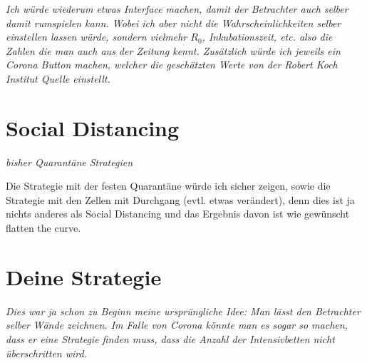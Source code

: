 \documentclass[11pt,a4paper]{article}
\begin{document}
\textit{Ich würde wiederum etwas Interface machen, damit der Betrachter auch selber damit rumspielen kann. Wobei ich aber nicht die Wahrscheinlichkeiten selber einstellen lassen würde, sondern vielmehr \(R_0\), Inkubationszeit, etc. also die Zahlen die man auch aus der Zeitung kennt. Zusätzlich würde ich jeweils ein Corona Button machen, welcher die geschätzten Werte von der Robert Koch Institut Quelle einstellt.}

\section{Social Distancing}
\textit{bisher Quarantäne Strategien}

\noindent
Die Strategie mit der festen Quarantäne würde ich sicher zeigen, sowie die Strategie mit den Zellen mit Durchgang (evtl. etwas verändert), denn dies ist ja nichts anderes als Social Distancing und das Ergebnis davon ist wie gewünscht flatten the curve.

\section{Deine Strategie}
\textit{Dies war ja schon zu Beginn meine ursprüngliche Idee: Man lässt den Betrachter selber Wände zeichnen. Im Falle von Corona könnte man es sogar so machen, dass er eine Strategie finden muss, dass die Anzahl der Intensivbetten nicht überschritten wird.}
\end{document}
